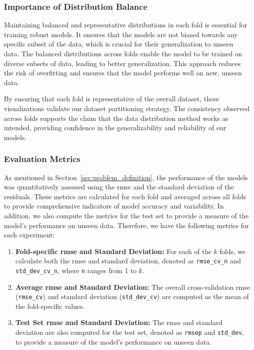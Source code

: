 \subsubsection{Importance of Distribution Balance}
Maintaining balanced and representative distributions in each fold is essential for training robust models.
It ensures that the models are not biased towards any specific subset of the data, which is crucial for their generalization to unseen data.
The balanced distributions across folds enable the model to be trained on diverse subsets of data, leading to better generalization.
This approach reduces the risk of overfitting and ensures that the model performs well on new, unseen data.

By ensuring that each fold is representative of the overall dataset, these visualizations validate our dataset partitioning strategy.
The consistency observed across folds supports the claim that the data distribution method works as intended, providing confidence in the generalizability and reliability of our models.

\subsubsection{Evaluation Metrics}\label{subsubsec:evaluation_metrics}
As mentioned in Section~\ref{sec:problem_definition}, the performance of the models was quantitatively assessed using the \gls{rmse} and the standard deviation of the residuals.
These metrics are calculated for each fold and averaged across all folds to provide comprehensive indicators of model accuracy and variability.
In addition, we also compute the metrics for the test set to provide a measure of the model's performance on unseen data.
Therefore, we have the following metrics for each experiment:
\begin{enumerate}
    \item \textbf{Fold-specific \gls{rmse} and Standard Deviation:} For each of the $k$ folds, we calculate both the \gls{rmse} and standard deviation, denoted as \texttt{rmse\_cv\_n} and \texttt{std\_dev\_cv\_n}, where \texttt{n} ranges from 1 to $k$.
    \item \textbf{Average \gls{rmse} and Standard Deviation:} The overall cross-validation \gls{rmse} (\texttt{rmse\_cv}) and standard deviation (\texttt{std\_dev\_cv}) are computed as the mean of the fold-specific values.
    \item \textbf{Test Set \gls{rmse} and Standard Deviation:} The \gls{rmse} and standard deviation are also computed for the test set, denoted as \texttt{rmsep} and \texttt{std\_dev}, to provide a measure of the model's performance on unseen data.
\end{enumerate}

